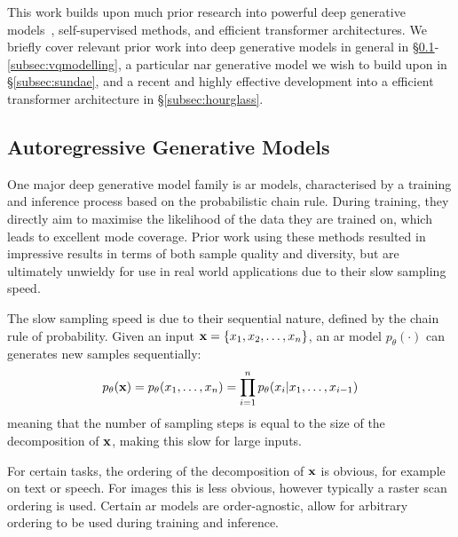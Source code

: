 This work builds upon much prior research into powerful deep generative
models~\cite{bondtaylor2021review}, self-supervised methods, and efficient
transformer architectures. We briefly cover relevant prior work into deep
generative models in general in \S\ref{subsec:agm}-\ref{subsec:vqmodelling}, a
particular \acrshort{nar} generative model we wish to build upon in
\S\ref{subsec:sundae}, and a recent and highly effective development into a
efficient transformer architecture in \S\ref{subsec:hourglass}.

\subsection{Autoregressive Generative Models}
\label{subsec:agm}
One major deep generative model family is \acrfull{ar} models, characterised by
a training and inference process based on the probabilistic chain rule. During
training, they directly aim to maximise the likelihood of the data they are
trained on, which leads to excellent mode coverage. Prior work using these
methods resulted in impressive results in terms of both sample quality and
diversity, but are ultimately unwieldy for use in real world applications due to
their slow sampling speed.

The slow sampling speed is due to their sequential nature, defined by the chain
rule of probability. Given an input $\mathbf{x} = \{ x_{1}, x_{2}, \dots,
x_{n} \}$, an \gls{ar} model $p_\theta(\cdot)$ can generates new
samples sequentially:
\begin{equation}\label{eq:ar}
    p_\theta(\mathbf{x}) = p_\theta(x_{1}, \dots, x_{n}) =
    \prod\limits^{n}_{i=1} p_\theta(x_{i} \vert x_{1}, \dots, x_{i-1})
\end{equation}
meaning that the number of sampling steps is equal to the size of the
decomposition of $\mathbf{x}$, making this slow for large inputs.

For certain tasks, the ordering of the decomposition of $\mathbf{x}$ is obvious, for
example on text or speech. For images this is less obvious, however typically a
raster scan ordering is used. Certain \gls{ar} models are order-agnostic,
allow for arbitrary ordering to be used during training and inference.

